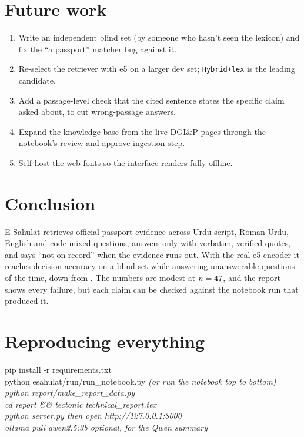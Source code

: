 \documentclass[11pt,a4paper]{article}
\begin{document}
\section{Future work}
\begin{enumerate}
  \item Write an independent blind set (by someone who hasn't seen the lexicon) and fix the ``a passport'' matcher bug against it.
  \item Re-select the retriever with e5 on a larger dev set; \texttt{Hybrid+lex} is the leading candidate.
  \item Add a passage-level check that the cited sentence states the specific claim asked about, to cut wrong-passage answers.
  \item Expand the knowledge base from the live DGI\&P pages through the notebook's review-and-approve ingestion step.
  \item Self-host the web fonts so the interface renders fully offline.
\end{enumerate}

\section{Conclusion}
E-Sahulat retrieves official passport evidence across Urdu script, Roman Urdu, English and code-mixed questions, answers only
with verbatim, verified quotes, and says ``not on record'' when the evidence runs out. With the real e5 encoder it reaches
\BlindEfiveAcc{} decision accuracy on a blind set while answering unanswerable questions \BlindEfiveFalse{} of the time, down
from \BlindBaseFalse. The numbers are modest at $n=47$, and the report shows every failure, but each claim can be checked
against the notebook run that produced it.

\appendix
\section{Reproducing everything}
\begin{notebox}[Commands]
\small\ttfamily
pip install -r requirements.txt\\
python esahulat/run/run\_notebook.py \quad \rmfamily\itshape (or run the notebook top to bottom)\ttfamily\upshape\\
python report/make\_report\_data.py\\
cd report \&\& tectonic technical\_report.tex\\
python server.py \quad \rmfamily\itshape then open http://127.0.0.1:8000\ttfamily\upshape\\
ollama pull qwen2.5:3b \quad \rmfamily\itshape optional, for the Qwen summary
\end{notebox}
\end{document}
